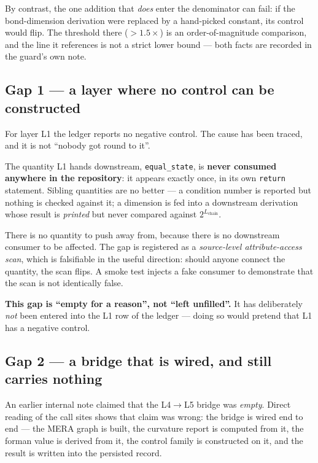 \documentclass[11pt,a4paper]{article}
\newcommand{\code}[1]{\texttt{\small #1}}
\begin{document}
\noindent By contrast, the one addition that \emph{does} enter the denominator can
fail: if the bond-dimension derivation were replaced by a hand-picked constant, its
control would flip. The threshold there ($>1.5\times$) is an order-of-magnitude
comparison, and the line it references is not a strict lower bound --- both facts
are recorded in the guard's own note.

\subsection{Gap 1 --- a layer where no control can be constructed}
\label{sec:l1gap}

For layer L1 the ledger reports no negative control. The cause has been traced, and
it is not ``nobody got round to it''.

The quantity L1 hands downstream, \code{equal\_state}, is \textbf{never consumed
anywhere in the repository}: it appears exactly once, in its own \code{return}
statement. Sibling quantities are no better --- a condition number is reported but
nothing is checked against it; a dimension is fed into a downstream derivation whose
result is \emph{printed} but never compared against $2^{L_{\text{chain}}}$.

There is no quantity to push away from, because there is no downstream consumer to
be affected. The gap is registered as a \emph{source-level attribute-access scan},
which is falsifiable in the useful direction: should anyone connect the quantity, the
scan flips. A smoke test injects a fake consumer to demonstrate that the scan is not
identically false.

\medskip
\noindent\textbf{This gap is ``empty for a reason'', not ``left unfilled''.} It has
deliberately \emph{not} been entered into the L1 row of the ledger --- doing so would
pretend that L1 has a negative control.

\subsection{Gap 2 --- a bridge that is wired, and still carries nothing}
\label{sec:l4l5}

An earlier internal note claimed that the L4$\to$L5 bridge was \emph{empty}. Direct
reading of the call sites shows that claim was wrong: the bridge is wired end to
end --- the MERA graph is built, the curvature report is computed from it, the
forman value is derived from it, the control family is constructed on it, and the
result is written into the persisted record.
\end{document}
